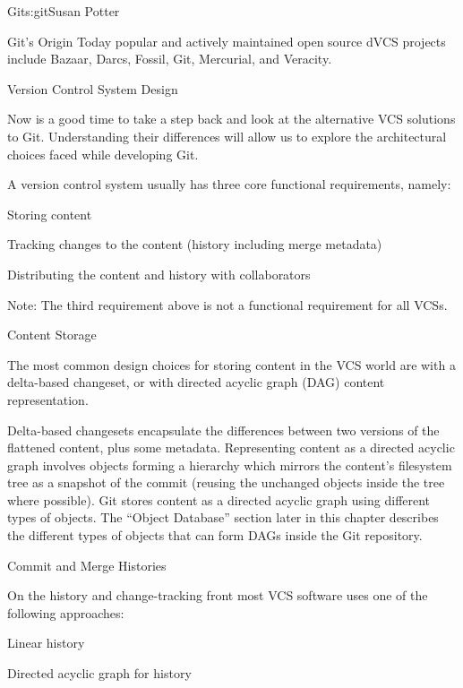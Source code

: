 \begin{aosachapter}{Git}{s:git}{Susan Potter}
\begin{aosasect1}{Git's Origin}
Today popular and actively maintained open source dVCS projects include
Bazaar, Darcs, Fossil, Git, Mercurial, and Veracity.

\end{aosasect1}

\begin{aosasect1}{Version Control System Design}

Now is a good time to take a step back and look at the alternative VCS
solutions to Git. Understanding their differences will allow us to explore
the architectural choices faced while developing Git.

A version control system usually has three core functional
requirements, namely:

\begin{aosaitemize}
  \item Storing content
  \item Tracking changes to the content (history including merge metadata)
  \item Distributing the content and history with collaborators
\end{aosaitemize}

\noindent Note: The third requirement above is not a functional requirement for
all VCSs.

\begin{aosasect2}{Content Storage}

The most common design choices for storing content in the VCS world are with
a delta-based changeset, or with directed acyclic graph (DAG) content 
representation.

Delta-based changesets encapsulate the differences between two versions of
the flattened content, plus some metadata. Representing content as a
directed acyclic graph involves objects forming a hierarchy
which mirrors the content's filesystem tree as a snapshot of the commit (reusing
the unchanged objects inside the tree where possible). Git stores content as
a directed acyclic graph using different types of objects. The
``Object Database'' section later in this chapter describes the different
types of objects that can form DAGs inside the Git repository.

\end{aosasect2}
\begin{aosasect2}{Commit and Merge Histories}

On the history and change-tracking front most VCS software uses one of
the following approaches:
\begin{aosaitemize}
  \item Linear history
  \item Directed acyclic graph for history
\end{aosaitemize}


\end{aosasect2}
\end{aosasect1}
\end{aosachapter}
